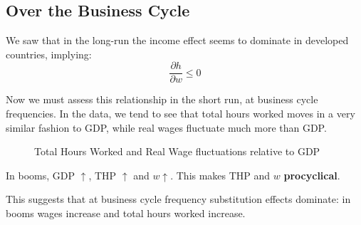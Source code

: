 \documentclass[11pt]{article}
\begin{document}
\subsection{Over the Business Cycle}

We saw that in the long-run the income effect seems to dominate in developed countries, implying:
\[\dfrac{\partial h}{\partial w}\leq0\]

Now we must assess this relationship in the short run, at business cycle frequencies. In the data, we tend to see that total hours worked moves in a very similar fashion to GDP, while real wages fluctuate much more than GDP.

\begin{figure}[h]
    \centering
    \qquad
    \caption{Total Hours Worked and Real Wage fluctuations relative to GDP}%
    \label{fig:panel format}%
\end{figure}
\begin{intu}
    In booms, GDP $\uparrow$, THP $ \uparrow$ and $w\uparrow$. This makes THP and $w$ \textbf{procyclical}. 
    
    This suggests that at business cycle frequency substitution effects dominate: in booms wages increase and total hours worked increase.
\end{intu}
\end{document}

